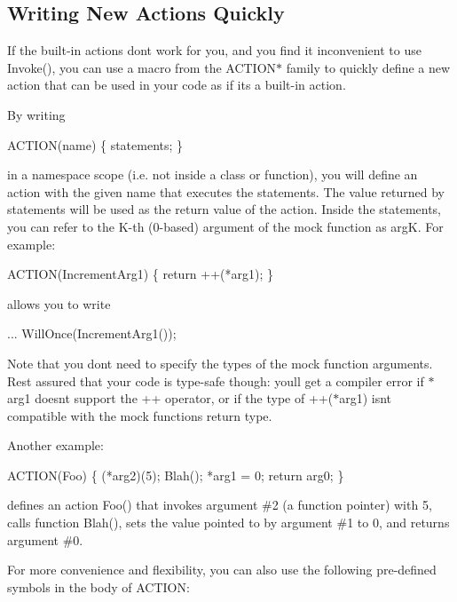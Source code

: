 \subsection*{Writing New Actions Quickly}

If the built-\/in actions don\textquotesingle{}t work for you, and you find it inconvenient to use {\ttfamily Invoke()}, you can use a macro from the {\ttfamily A\+C\+T\+I\+O\+N$\ast$} family to quickly define a new action that can be used in your code as if it\textquotesingle{}s a built-\/in action.

By writing 
\begin{DoxyCode}
ACTION(name) \{ statements; \}
\end{DoxyCode}
 in a namespace scope (i.\+e. not inside a class or function), you will define an action with the given name that executes the statements. The value returned by {\ttfamily statements} will be used as the return value of the action. Inside the statements, you can refer to the K-\/th (0-\/based) argument of the mock function as {\ttfamily argK}. For example\+: 
\begin{DoxyCode}
ACTION(IncrementArg1) \{ return ++(*arg1); \}
\end{DoxyCode}
 allows you to write 
\begin{DoxyCode}
... WillOnce(IncrementArg1());
\end{DoxyCode}


Note that you don\textquotesingle{}t need to specify the types of the mock function arguments. Rest assured that your code is type-\/safe though\+: you\textquotesingle{}ll get a compiler error if {\ttfamily $\ast$arg1} doesn\textquotesingle{}t support the {\ttfamily ++} operator, or if the type of {\ttfamily ++($\ast$arg1)} isn\textquotesingle{}t compatible with the mock function\textquotesingle{}s return type.

Another example\+: 
\begin{DoxyCode}
ACTION(Foo) \{
  (*arg2)(5);
  Blah();
  *arg1 = 0;
  return arg0;
\}
\end{DoxyCode}
 defines an action {\ttfamily Foo()} that invokes argument \#2 (a function pointer) with 5, calls function {\ttfamily Blah()}, sets the value pointed to by argument \#1 to 0, and returns argument \#0.

For more convenience and flexibility, you can also use the following pre-\/defined symbols in the body of {\ttfamily A\+C\+T\+I\+ON}\+:

